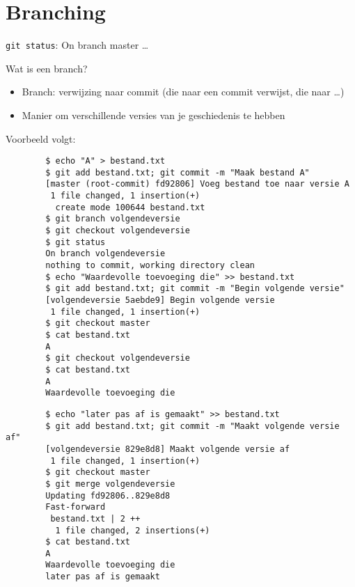 \section{Branching}

\begin{frame}
	\texttt{git status}: On branch master \ldots
\end{frame}

\begin{frame}{Wat is een branch?}
	\begin{itemize}
		\item Branch: verwijzing naar commit (die naar een commit verwijst, die naar \ldots)
		\item Manier om verschillende versies van je geschiedenis te hebben
	\end{itemize}
	Voorbeeld volgt:
\end{frame}

\begin{frame}[fragile]
	\begin{verbatim}
		$ echo "A" > bestand.txt
		$ git add bestand.txt; git commit -m "Maak bestand A"
		[master (root-commit) fd92806] Voeg bestand toe naar versie A
		 1 file changed, 1 insertion(+)
		  create mode 100644 bestand.txt
		$ git branch volgendeversie
		$ git checkout volgendeversie
		$ git status
		On branch volgendeversie
		nothing to commit, working directory clean
		$ echo "Waardevolle toevoeging die" >> bestand.txt
		$ git add bestand.txt; git commit -m "Begin volgende versie"
		[volgendeversie 5aebde9] Begin volgende versie
		 1 file changed, 1 insertion(+)
		$ git checkout master
		$ cat bestand.txt
		A
		$ git checkout volgendeversie
		$ cat bestand.txt
		A
		Waardevolle toevoeging die
	\end{verbatim}
\end{frame}

\begin{frame}[fragile]
	\begin{verbatim}
		$ echo "later pas af is gemaakt" >> bestand.txt
		$ git add bestand.txt; git commit -m "Maakt volgende versie af"
		[volgendeversie 829e8d8] Maakt volgende versie af
		 1 file changed, 1 insertion(+)
		$ git checkout master
		$ git merge volgendeversie
		Updating fd92806..829e8d8
		Fast-forward
		 bestand.txt | 2 ++
		  1 file changed, 2 insertions(+)
		$ cat bestand.txt
		A
		Waardevolle toevoeging die
		later pas af is gemaakt
	\end{verbatim}
\end{frame}

